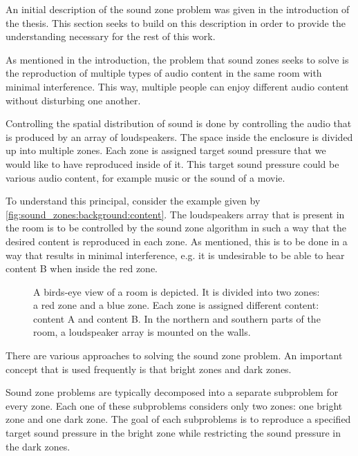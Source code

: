 An initial description of the sound zone problem was given in the introduction of the thesis.
This section seeks to build on this description in order to provide the understanding necessary 
for the rest of this work.

As mentioned in the introduction, the problem that sound zones seeks to solve is the reproduction
of multiple types of audio content in the same room with minimal interference.
This way, multiple people can enjoy different audio content without disturbing one another.

Controlling the spatial distribution of sound is done by controlling the 
audio that is produced by an array of loudspeakers.
The space inside the enclosure is divided up into multiple zones.
Each zone is assigned target sound pressure that we would like to have reproduced inside of it.
This target sound pressure could be various audio content, for example music or the sound of a movie.

To understand this principal, consider the example given by \autoref{fig:sound_zones:background:content}.
The loudspeakers array that is present in the room is to be controlled by the sound zone algorithm 
in such a way that the desired content is reproduced in each zone.
As mentioned, this is to be done in a way that results in minimal interference, e.g. it is undesirable
to be able to hear content B when inside the red zone.

\begin{figure}[h]
    \centering
    \scalebox{1.0}{}
    \caption{A birds-eye view of a room is depicted.
        It is divided into two zones: a red zone and a blue zone.
        Each zone is assigned different content: content A and content B.
        In the northern and southern parts of the room, a loudspeaker array is mounted on the walls.
        }
    \label{fig:sound_zones:background:content}
\end{figure}

There are various approaches to solving the sound zone problem.
An important concept that is used frequently is that bright zones and dark zones.

Sound zone problems are typically decomposed into a separate subproblem for every zone.
Each one of these subproblems considers only two zones: one bright zone and one dark zone.
The goal of each subproblems is to reproduce a specified target sound pressure in the bright zone while restricting the 
sound pressure in the dark zones.

